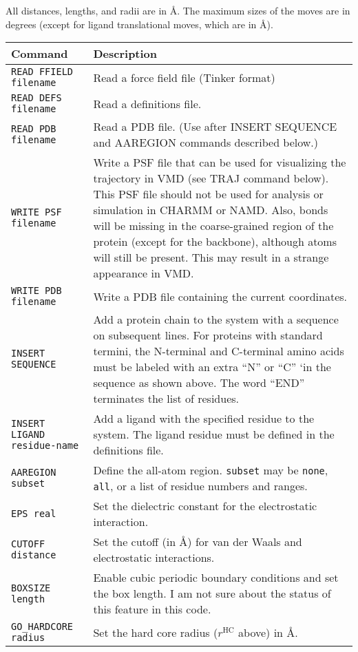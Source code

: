 \documentclass{article}      %
\begin{document}
All distances, lengths, and radii are in \AA.  The maximum sizes of the moves are in degrees (except for ligand translational moves, which are in \AA).

\begin{longtable}{|l|p{3.25in}|}
\hline
Command & Description \\
\hline
\verb+READ FFIELD filename+ & Read a force field file (Tinker format) \\
\hline
\verb+READ DEFS filename+ & Read a definitions file. \\
\hline
\verb+READ PDB filename+ & Read a PDB file. (Use after INSERT SEQUENCE and AAREGION commands described below.) \\
\hline
\verb+WRITE PSF filename+ & Write a PSF file that can be used for visualizing the trajectory in VMD (see TRAJ command below).  This PSF file should not be used for analysis or simulation in CHARMM or NAMD.  Also, bonds will be missing in the coarse-grained region of the  protein (except for the backbone), although atoms will still be present.  This may result in a strange appearance in VMD. \\ 
\hline
\verb+WRITE PDB filename+ & Write a PDB file containing the current coordinates. \\
\hline
\verb+INSERT SEQUENCE+ & Add a protein chain to the system with a sequence on subsequent lines.  For proteins with standard termini, the N-terminal and C-terminal amino acids must be labeled with an extra ``N'' or ``C'' `in the sequence as shown above.  The word ``END'' terminates the list of residues. \\
\hline
\verb+INSERT LIGAND residue-name+ & Add a ligand with the specified residue to the system.  The ligand residue must be defined in the definitions file.\\
\hline
\verb+AAREGION subset+ & Define the all-atom region.  \verb+subset+ may be \verb+none+, \verb+all+, or a list of residue numbers and ranges. \\
\hline
\verb+EPS real+& Set the dielectric constant for the electrostatic interaction. \\
\hline
\verb+CUTOFF distance+& Set the cutoff (in \AA) for van der Waals and electrostatic interactions. \\
\hline
\verb+BOXSIZE length+& Enable cubic periodic boundary conditions and set the box length.  I am not sure about the status of this feature in this code. \\
\hline
\verb+GO_HARDCORE radius+ & Set the hard core radius ($r^\mathrm{HC}$ above) in \AA. \\

\end{longtable}
\end{document}
